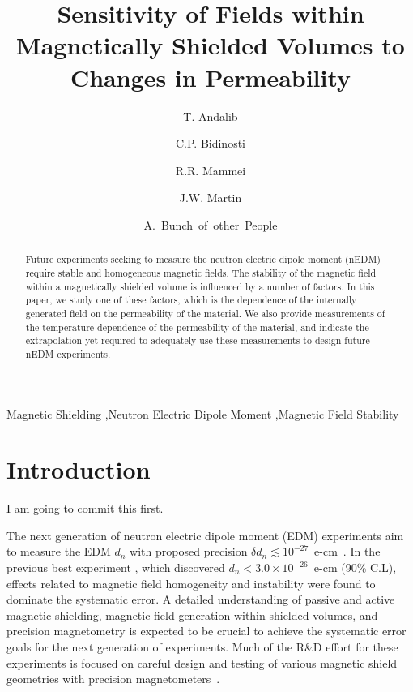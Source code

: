 \documentclass[review]{elsarticle}
\begin{document}
\begin{frontmatter}

\title{Sensitivity of Fields within Magnetically Shielded Volumes to
  Changes in Permeability}

\author[manitoba]{T. Andalib}
\author[winnipeg,manitoba]{C.P. Bidinosti}
\author[winnipeg,manitoba]{R.R. Mammei}
\author[winnipeg,manitoba]{J.W. Martin}
\author[winnipeg]{A.~Bunch~of~other~People}


\address[winnipeg]{Physics Department, The University of Winnipeg, 515 Portage Avenue, Winnipeg, MB, R3B 2E9, Canada}
\address[manitoba]{Department of Physics and Astronomy, University of Manitoba, Winnipeg, MB R3T 2N2, Canada}


\begin{abstract}
Future experiments seeking to measure the neutron electric dipole
moment (nEDM) require stable and homogeneous magnetic fields.  The
stability of the magnetic field within a magnetically shielded volume
is influenced by a number of factors.  In this paper, we study one of
these factors, which is the dependence of the internally generated
field on the permeability of the material.  We also provide
measurements of the temperature-dependence of the permeability of the
material, and indicate the extrapolation yet required to adequately
use these measurements to design future nEDM experiments.
\end{abstract}

\begin{keyword}
Magnetic Shielding \sep Neutron Electric Dipole Moment \sep Magnetic Field Stability
\end{keyword}

\end{frontmatter}

\linenumbers

\section{Introduction}

I am going to commit this first.

The next generation of neutron electric dipole moment (EDM)
experiments aim to measure the EDM $d_n$ with proposed precision
$\delta d_n\lesssim
10^{-27}$~e-cm~\cite{bib:nedm1,bib:nedm2,bib:nedm2.5,bib:nedm3,bib:nedm3.5,bib:nedm4,bib:nedm5,bib:nedm6,bib:nedm6.5}.
In the previous best experiment \cite{bib:pendlebury}, which
discovered $d_n<3.0\times 10^{-26}$~e-cm (90\% C.L), effects related
to magnetic field homogeneity and instability were found to dominate
the systematic error.  A detailed understanding of passive and active
magnetic shielding, magnetic field generation within shielded volumes,
and precision magnetometry is expected to be crucial to achieve the
systematic error goals for the next generation of experiments.  Much
of the R\&D effort for these experiments is focused on careful design
and testing of various magnetic shield geometries with precision
magnetometers~\cite{bib:brys,bib:afach,bib:fierlingerroom,bib:sturmthesis,bib:patton}.
\end{document}
